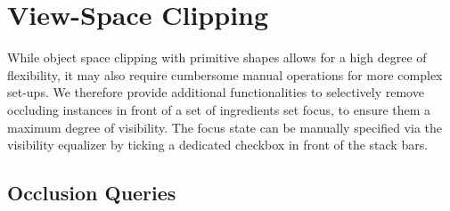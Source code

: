 \vspace{-2mm}
\section{View-Space Clipping}

While object space clipping with primitive shapes allows for a high degree of flexibility, it may also require cumbersome manual operations for more complex set-ups.
We therefore provide additional functionalities to selectively remove occluding instances in front of a set of ingredients set focus, to ensure them a maximum degree of visibility.
The focus state can be manually specified via the visibility equalizer by ticking a dedicated checkbox in front of the stack bars.

\vspace{-2mm}
\subsection{Occlusion Queries}
\label{sec:OQ}

